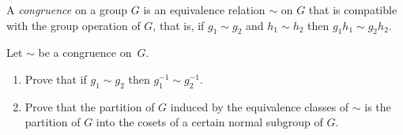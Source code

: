 \documentclass[oneside,10pt]{amsart}
\begin{document}
A \emph{congruence} on a group $G$ is an equivalence relation $\sim$ on $G$ that is compatible with the group operation of $G$, that is, if $g_1 \sim g_2$ and $h_1 \sim h_2$ then $g_1h_1 \sim g_2h_2$.

Let $\sim$ be a congruence on~$G$.
\begin{enumerate}[label=(\alph*)]
\item
Prove that if $g_1 \sim g_2$ then $g_1^{-1} \sim g_2^{-1}$.
\item
Prove that the partition of $G$ induced by the equivalence classes of $\sim$ is the partition of $G$ into the cosets of a certain normal subgroup of $G$.
\end{enumerate}
\end{document}
